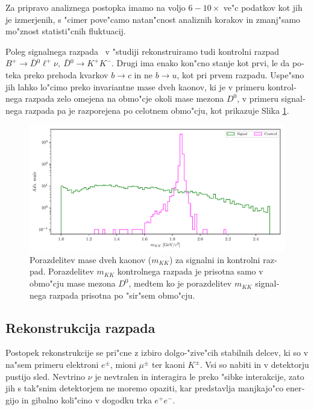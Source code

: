 \begin{otherlanguage}{slovene}
Za pripravo analiznega postopka imamo na voljo $6-10\times$ ve"c podatkov kot jih je izmerjenih, s "cimer pove"camo natan"cnost analiznih korakov in zmanj"samo mo"znost statisti"cnih fluktuacij.

Poleg signalnega razpada \decayb~v "studiji rekonstruiramo tudi kontrolni razpad $B^+ \to \bar D {}^0 \ell^+ \nu,~\bar D{}^0 \to K^+K^-$. Drugi ima enako kon"cno stanje kot prvi, le da poteka preko prehoda kvarkov $b \to c$ in ne $b \to u$, kot pri prvem razpadu. Uspe"sno jih lahko lo"cimo preko invariantne mase dveh kaonov, ki je v primeru kontrolnega razpada zelo omejena na obmo"cje okoli mase mezona $D^0$, v primeru signalnega razpada pa je razporejena po celotnem obmo"cju, kot prikazuje Slika \ref{fig:mKK_si}.

\begin{figure}[H]
	\centering
	\captionsetup{width=0.8\linewidth}
	\includegraphics[width=\linewidth]{fig/mKK_si}
	\caption{Porazdelitev mase dveh kaonov ($m_{KK}$) za signalni in kontrolni razpad. Porazdelitev $m_{KK}$ kontrolnega razpada je prisotna samo v obmo"cju mase mezona $D^0$, medtem ko je porazdelitev $m_{KK}$ signalnega razpada prisotna po "sir"sem obmo"cju.}
	\label{fig:mKK_si}
\end{figure}

\subsection{Rekonstrukcija razpada}

Postopek rekonstrukcije se pri"cne z izbiro dolgo-"zive"cih stabilnih delcev, ki so v na"sem primeru elektroni $e^\pm$, mioni $\mu^\pm$ ter kaoni $K^\pm$. Vsi so nabiti in v detektorju pustijo sled. Nevtrino $\nu$ je nevtralen in interagira le preko "sibke interakcije, zato jih s tak"snim detektorjem ne moremo opaziti, kar predstavlja manjkajo"co energijo in gibalno koli"cino v dogodku trka $e^+e^-$.


\end{otherlanguage}
